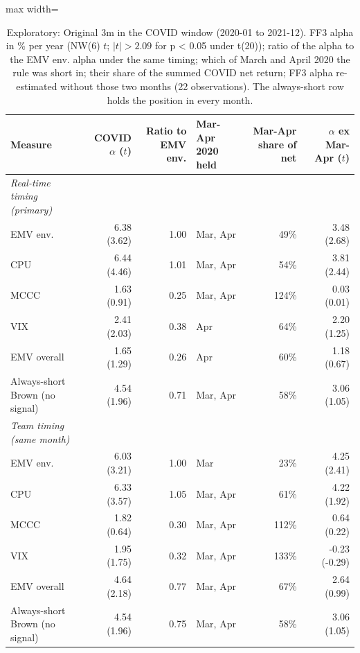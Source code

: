 \begin{table}[H]
\centering\footnotesize
\caption{Exploratory: Original 3m in the COVID window (2020-01 to 2021-12). FF3 alpha in \% per year (NW(6) $t$; $|t| > 2.09$ for p < 0.05 under t(20)); ratio of the alpha to the EMV env. alpha under the same timing; which of March and April 2020 the rule was short in; their share of the summed COVID net return; FF3 alpha re-estimated without those two months (22 observations). The always-short row holds the position in every month.}
\label{tab:m1b_covid_attribution}
\begin{adjustbox}{max width=\linewidth}
\begin{tabular}{lrrlrr}
\toprule
Measure & COVID $\alpha$ ($t$) & Ratio to EMV env. & Mar-Apr 2020 held & Mar-Apr share of net & $\alpha$ ex Mar-Apr ($t$) \\
\midrule
\textit{Real-time timing (primary)} &  &  &  &  &  \\
EMV env. & 6.38 (3.62) & 1.00 & Mar, Apr & 49\% & 3.48 (2.68) \\
CPU & 6.44 (4.46) & 1.01 & Mar, Apr & 54\% & 3.81 (2.44) \\
MCCC & 1.63 (0.91) & 0.25 & Mar, Apr & 124\% & 0.03 (0.01) \\
VIX & 2.41 (2.03) & 0.38 & Apr & 64\% & 2.20 (1.25) \\
EMV overall & 1.65 (1.29) & 0.26 & Apr & 60\% & 1.18 (0.67) \\
Always-short Brown (no signal) & 4.54 (1.96) & 0.71 & Mar, Apr & 58\% & 3.06 (1.05) \\
\textit{Team timing (same month)} &  &  &  &  &  \\
EMV env. & 6.03 (3.21) & 1.00 & Mar & 23\% & 4.25 (2.41) \\
CPU & 6.33 (3.57) & 1.05 & Mar, Apr & 61\% & 4.22 (1.92) \\
MCCC & 1.82 (0.64) & 0.30 & Mar, Apr & 112\% & 0.64 (0.22) \\
VIX & 1.95 (1.75) & 0.32 & Mar, Apr & 133\% & -0.23 (-0.29) \\
EMV overall & 4.64 (2.18) & 0.77 & Mar, Apr & 67\% & 2.64 (0.99) \\
Always-short Brown (no signal) & 4.54 (1.96) & 0.75 & Mar, Apr & 58\% & 3.06 (1.05) \\
\bottomrule
\end{tabular}
\end{adjustbox}
\end{table}
